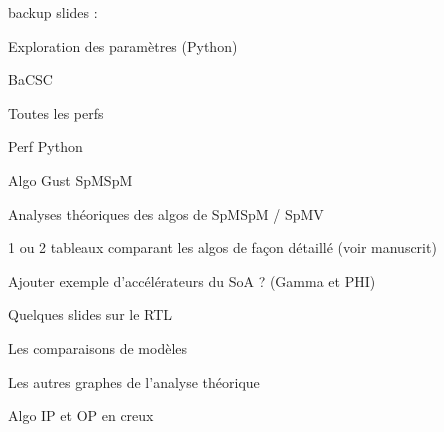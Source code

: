 \documentclass[9pt,aspectratio=169]{beamer}
\begin{document}
\begin{frame}
    backup slides :

    Exploration des paramètres (Python)

    BaCSC

    Toutes les perfs

    Perf Python

    Algo Gust SpMSpM

    Analyses théoriques des algos de SpMSpM / SpMV

    1 ou 2 tableaux comparant les algos de façon détaillé (voir manuscrit)

    Ajouter exemple d'accélérateurs du SoA ? (Gamma et PHI)

    Quelques slides sur le RTL

    Les comparaisons de modèles

    Les autres graphes de l'analyse théorique

    Algo IP et OP en creux
\end{frame}
\end{document}
